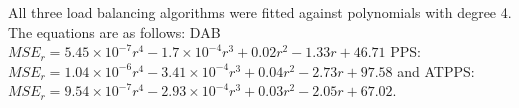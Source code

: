 All three load balancing algorithms were fitted against polynomials with degree 4. The equations are as follows: DAB $MSE_r=5.45\times 10 ^{-7}r^{4}-1.7\times 10^{-4}r^{3}+0.02r^{2}-1.33r+46.71$ PPS: $MSE_r=1.04\times 10 ^{-6}r^{4}-3.41\times 10^{-4}r^{3}+0.04r^{2}-2.73r+97.58$ and ATPPS: $MSE_r=9.54\times 10^{-7}r^{4}-2.93\times 10^{-4}r^{3}+0.03r^{2}-2.05r+67.02$.
%
%
%

